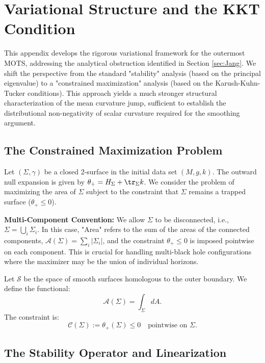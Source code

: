 \section{Variational Structure and the KKT Condition}\label{app:KKT_Variational}

This appendix develops the rigorous variational framework for the outermost MOTS, addressing the analytical obstruction identified in Section \ref{sec:Jang}. We shift the perspective from the standard "stability" analysis (based on the principal eigenvalue) to a "constrained maximization" analysis (based on the Karush-Kuhn-Tucker conditions). This approach yields a much stronger structural characterization of the mean curvature jump, sufficient to establish the distributional non-negativity of scalar curvature required for the smoothing argument.

\subsection{The Constrained Maximization Problem}

Let $(\Sigma, \gamma)$ be a closed 2-surface in the initial data set $(M, g, k)$. The outward null expansion is given by $\theta_+ = H_\Sigma + \tr_\Sigma k$.
We consider the problem of maximizing the area of $\Sigma$ subject to the constraint that $\Sigma$ remains a trapped surface ($\theta_+ \le 0$).

\textbf{Multi-Component Convention:} We allow $\Sigma$ to be disconnected, i.e., $\Sigma = \bigcup_i \Sigma_i$. In this case, "Area" refers to the sum of the areas of the connected components, $\mathcal{A}(\Sigma) = \sum_i |\Sigma_i|$, and the constraint $\theta_+ \le 0$ is imposed pointwise on each component. This is crucial for handling multi-black hole configurations where the maximizer may be the union of individual horizons.

Let $\mathcal{S}$ be the space of smooth surfaces homologous to the outer boundary. We define the functional:
\begin{equation}
    \mathcal{A}(\Sigma) = \int_\Sigma dA.
\end{equation}
The constraint is:
\begin{equation}
    \mathcal{C}(\Sigma) := \theta_+(\Sigma) \le 0 \quad \text{pointwise on } \Sigma.
\end{equation}

\subsection{The Stability Operator and Linearization}

